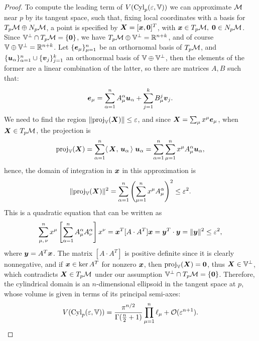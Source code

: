 \documentclass[letterpaper, reqno, 11pt]{amsart}
\theoremstyle{definition}
\theoremstyle{remark}
\numberwithin{equation}{section}
\begin{document}
\begin{proof}
To compute the leading term of $V(\mathrm{Cyl}_p(\varepsilon,\mathbb{V}))$ we can approximate ${\mathcal M}$ near $p$ by its tangent space, such that, fixing local coordinates with a basis for $T_p{\mathcal M}\oplus N_p{\mathcal M}$, a point is specified by $\boldsymbol{X}=[\boldsymbol{x},\boldsymbol{0}]^T$, with $\boldsymbol{x}\in T_p{\mathcal M},\;\boldsymbol{0}\in N_p{\mathcal M}$. Since $\mathbb{V}^\perp\cap T_p{\mathcal M}=\{\boldsymbol{0}\}$, we have $T_p{\mathcal M}\oplus\mathbb{V}^\perp={\mathbb R}^{n+k}$, and of course $\mathbb{V}\oplus\mathbb{V}^\perp={\mathbb R}^{n+k}$. Let $\{\boldsymbol{e}_\mu\}_{\mu=1}^n$ be an orthornomal basis of $T_p{\mathcal M}$, and $\{\boldsymbol{u}_\alpha\}_{\alpha=1}^n\cup\{\boldsymbol{v}_j\}_{j=1}^k$ an orthonormal basis of $\mathbb{V}\oplus\mathbb{V}^\perp$, then the elements of the former are a linear combination of the latter, so there are matrices $A, B$ such that:
$$
\boldsymbol{e}_\mu = \sum_{\alpha=1}^n A^\alpha_\mu \boldsymbol{u}_\alpha + \sum_{j=1}^k B^j_\mu\boldsymbol{v}_j .
$$
We need to find the region $\|\mathrm{proj}_{\mathbb{V}}({\boldsymbol{X}})\|\leq\varepsilon$, and since $\boldsymbol{X}=\sum_{\mu}x^\mu\boldsymbol{e}_\mu$, when $\boldsymbol{X}\in T_p{\mathcal M}$, the projection is
$$
\mathrm{proj}_{\mathbb{V}}({\boldsymbol{X}}) = \sum_{\alpha=1}^n \langle\, {\boldsymbol{X}},\,{\boldsymbol{u}_\alpha}\,\rangle\;\boldsymbol{u}_\alpha = \sum_{\alpha=1}^n\sum_{\mu=1}^n x^\mu A^\alpha_\mu\boldsymbol{u}_\alpha,
$$
hence, the domain of integration in $\boldsymbol{x}$ in this approximation is
$$
\|\mathrm{proj}_{\mathbb{V}}({\boldsymbol{X}})\|^2 =\sum_{\alpha=1}^n\left(\sum_{\mu=1}^n x^\mu A^\alpha_\mu\right)^2  \leq\varepsilon^2.
$$
This is a quadratic equation that can be written as
\begin{align*}
	\sum_{\mu ,\,\nu}^n x^\mu\left[ \sum_{\alpha=1}^n A^\alpha_\mu A^\alpha_\nu \right] x^\nu = \boldsymbol{x}^T [A\cdot A^T] \boldsymbol{x} = \boldsymbol{y}^T\cdot\boldsymbol{y}=\|\boldsymbol{y}\|^2 \leq \varepsilon^2,
\end{align*}
where $\boldsymbol{y}=A^T\boldsymbol{x}$. The matrix $[A\cdot A^T]$ is positive definite since it is clearly nonnegative, and if $\boldsymbol{x}\in\ker A^T$ for nonzero $\boldsymbol{x}$, then $\mathrm{proj}_{\mathbb{V}}({\boldsymbol{X}})=\boldsymbol{0}$, thus $\boldsymbol{X}\in\mathbb{V}^\perp$, which contradicts $\boldsymbol{X}\in T_p{\mathcal M}$ under our assumption $\mathbb{V}^\perp\cap T_p{\mathcal M}=\{\boldsymbol{0}\}$. Therefore, the cylindrical domain is an $n$-dimensional ellipsoid in the tangent space at $p$, whose volume is given in terms of its principal semi-axes:
$$
V(\mathrm{Cyl}_p(\varepsilon,\mathbb{V})) =\frac{\pi^{n/2}}{\Gamma(\frac{n}{2}+1)}\prod^n_{\mu=1}\ell_\mu + {\mathcal O}(\varepsilon^{n+1}) .
$$


\end{proof}
\end{document}
